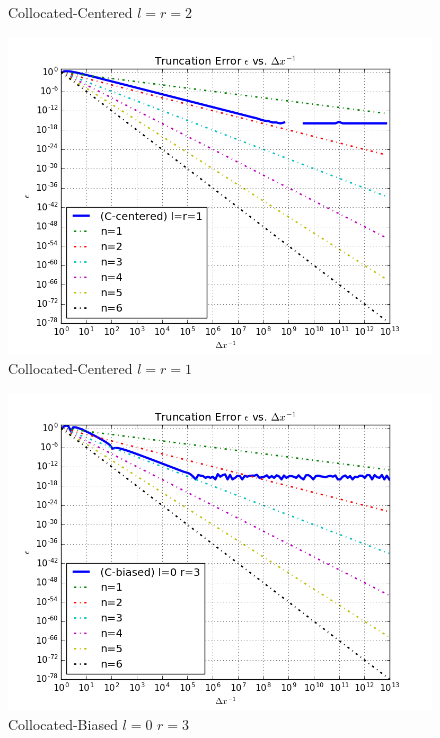 \documentclass[12pt]{article}
\newenvironment{problem}[2][Problem]{\begin{trivlist}
\item[\hskip \labelsep {\bfseries #1}\hskip \labelsep {\bfseries #2.}]}{\end{trivlist}}
\begin{document}
\begin{problem}{1}
\begin{figure}[h]
 \caption{Collocated-Centered $l = r= 2$}
\label{label}
\end{figure}
\begin{figure}
\centering
  \includegraphics[scale=0.5]{ccl1r1}
 \caption{Collocated-Centered $l = r= 1$}
\label{label}
\end{figure}
\begin{figure}[h]
\centering
  \includegraphics[scale=0.5]{cbl0r3}
 \caption{Collocated-Biased $l = 0$ $ r = 3$}
\label{label}
\end{figure}
\begin{figure}[h]
\centering

\end{figure}
\end{problem}
\end{document}
